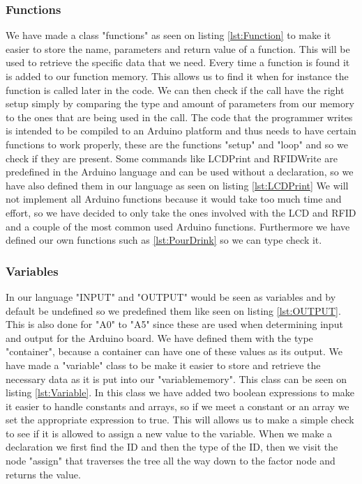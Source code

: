 \subsubsection{Functions}
\label{Functions}
We have made a class "functions" as seen on listing \ref{lst:Function} to make it easier to store the name, parameters and return value of a function. This will be used to retrieve the specific data that we need. Every time a function is found it is added to our function memory. This allows us to find it when for instance the function is called later in the code. We can then check if the call have the right setup simply by comparing the type and amount of parameters from our memory to the ones that are being used in the call.
The code that the programmer writes is intended to be compiled to an Arduino platform and thus needs to have certain functions to work properly, these are the functions "setup" and "loop" and so we check if they are present. Some commands like LCDPrint and RFIDWrite are predefined in the Arduino language and can be used without a declaration, so we have also defined them in our language as seen on listing \ref{lst:LCDPrint}
We will not implement all Arduino functions because it would take too much time and effort, so we have decided to only take the ones involved with the LCD and RFID and a couple of the most common used Arduino functions. Furthermore we have defined our own functions such as \ref{lst:PourDrink} so we can type check it.

\subsubsection{Variables}
\label{Variables}
In our language "INPUT" and "OUTPUT" would be seen as variables and by default be undefined so we predefined them like seen on listing \ref{lst:OUTPUT}. This is also done for "A0" to "A5" since these are used when determining input and output for the Arduino board. We have defined them with the type "container", because a container can have one of these values as its output.
We have made a "variable" class to be make it easier to store and retrieve the necessary data as it is put into our "variablememory". This class can be seen on listing \ref{lst:Variable}. In this class we have added two boolean expressions to make it easier to handle constants and arrays, so if we meet a constant or an array we set the appropriate expression to true. This will allows us to make a simple check to see if it is allowed to assign a new value to the variable.
When we make a declaration we first find the ID and then the type of the ID, then we visit the node "assign" that traverses the tree all the way down to the factor node and returns the value.

